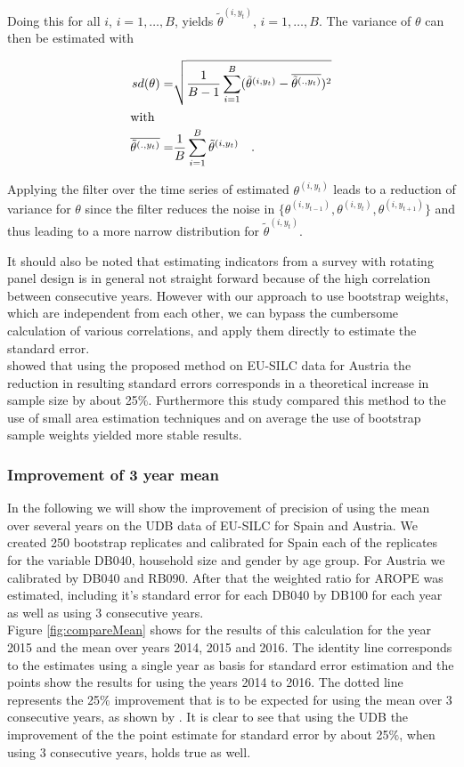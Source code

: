 \documentclass{scrartcl}\usepackage[]{graphicx}\usepackage[]{color}
\begin{document}
Doing this for all $i$, $i=1,\ldots,B$, yields $\tilde{\theta}^{(i,y_t)}$, $i=1,\ldots,B$. The variance of $\theta$ can then be estimated with

\begin{align*}
  sd(\theta) =& \sqrt{\frac{1}{B-1}\sum\limits_{i=1}^B (\tilde{\theta}^{(i,y_t)}-\overline{\tilde{\theta}^{(.,y_t)}})^2}\\
  \intertext{with}
  \overline{\tilde{\theta}^{(.,y_t)}}=&\frac{1}{B}\sum\limits_{i=1}^B\tilde{\theta}^{(i,y_t)} \quad.
\end{align*}

Applying the filter over the time series of estimated $\theta^{(i,y_t)}$ leads to a reduction of variance for $\theta$ since the filter reduces the noise in $\{\theta^{(i,y_{t-1})},\theta^{(i,y_t)},\theta^{(i,y_{t+1})}\}$ and thus leading to a more narrow distribution for $\tilde{\theta}^{(i,y_t)}$.

It should also be noted that estimating indicators from a survey with rotating panel design is in general not straight forward because of the high correlation between consecutive years. However with our approach to use bootstrap weights, which are independent from each other, we can bypass the cumbersome calculation of various correlations, and apply them directly to estimate the standard error.\\
\citep{silcstudy} showed that using the proposed method on EU-SILC data for Austria the reduction in resulting standard errors corresponds in a theoretical increase in sample size by about 25$\%$. Furthermore this study compared this method to the use of small area estimation techniques and on average the use of bootstrap sample weights yielded more stable results.\\

\subsubsection{Improvement of 3 year mean}
In the following we will show the improvement of precision of using the mean over several years on the UDB data of EU-SILC for Spain and Austria.
We created 250 bootstrap replicates and calibrated for Spain each of the replicates for the variable DB040, household size and gender by age group. For Austria we calibrated by DB040 and RB090. After that the weighted ratio for AROPE was estimated, including it's standard error for each DB040 by DB100 for each year as well as using 3 consecutive years.\\
Figure \ref{fig:compareMean} shows for the results of this calculation for the year 2015 and the mean over years 2014, 2015 and 2016.
The identity line corresponds to the estimates using a single year as basis for standard error estimation and the points show the results for using the years 2014 to 2016. The dotted line represents the 25$\%$ improvement that is to be expected for using the mean over 3 consecutive years, as shown by \citep{silcstudy}. It is clear to see that using the UDB the improvement of the the point estimate for standard error by about 25$\%$, when using 3 consecutive years, holds true as well.
\end{document}
